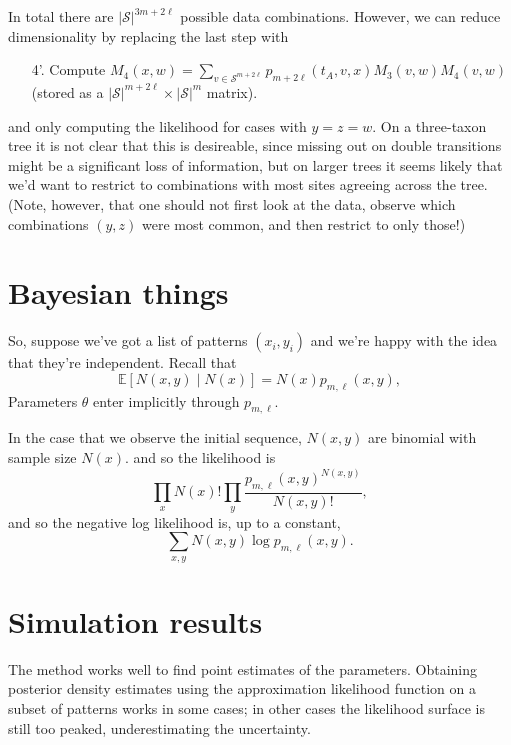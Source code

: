 \documentclass{article}
\newcommand{\E}{\mathbb{E}}
\newcommand{\calS}{\mathcal{S}}  %
\theoremstyle{plain}
\theoremstyle{definition}
\begin{document}
In total there are $|\calS|^{3m+2\ell}$ possible data combinations.
However, we can reduce dimensionality by replacing the last step with
\begin{enumerate}

  \item[4'.] Compute $M_4(x,w) = \sum_{v \in \calS^{m+2\ell}} p_{m+2\ell}(t_{A},v,x) M_3(v,w) M_4(v,w)$ (stored as a $|\calS|^{m+2\ell} \times |\calS|^{m}$ matrix).

\end{enumerate}
and only computing the likelihood for cases with $y=z=w$.
On a three-taxon tree it is not clear that this is desireable, since missing out on double transitions
might be a significant loss of information,
but on larger trees it seems likely that we'd want to restrict to combinations with most sites agreeing across the tree.
(Note, however, that one should not first look at the data, observe which combinations $(y,z)$ were most common, and then restrict to only those!)




\section{Bayesian things}

So, suppose we've got a list of patterns $(x_i,y_i)$
and we're happy with the idea that they're independent.
Recall that
\[
\E\left[ N(x,y) \mid N(x) \right] = N(x) p_{m,\ell}(x,y) ,
\]
Parameters $\theta$ enter implicitly through $p_{m,\ell}$.


In the case that we observe the initial sequence, $N(x,y)$ are binomial with sample size $N(x)$.
and so the likelihood is
\[
\prod_x N(x)! \prod_y \frac{ p_{m,\ell}(x,y)^{N(x,y)} }{ N(x,y)! } ,
\]
and so the negative log likelihood is, up to a constant,
\[
\sum_{x,y} N(x,y) \log p_{m,\ell}(x,y) .
\]





\section{Simulation results}

The method works well to find point estimates of the parameters.
Obtaining posterior density estimates using the approximation likelihood function on a subset of patterns
works in some cases;
in other cases the likelihood surface is still too peaked, underestimating the uncertainty.
\end{document}

